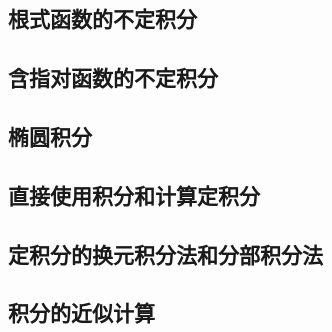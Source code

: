 \subsection{根式函数的不定积分}
\label{sec:indefinite-integration-of-irrational-function}

\subsection{含指对函数的不定积分}
\label{sec:indefinite-integration-of-exp-log-function}

\subsection{椭圆积分}
\label{sec:elliptic-integral}

\subsection{直接使用积分和计算定积分}
\label{sec:computation-of-definite-integral-by-riemann-sum}

\subsection{定积分的换元积分法和分部积分法}
\label{sec:definite-integral-by-substitution-or-partial}

\subsection{积分的近似计算}
\label{sec:approx-computation-of-integral}





